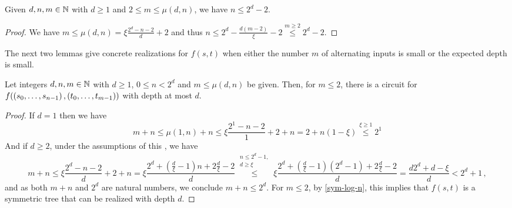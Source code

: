 
\begin{lemma} \label{n < 2^d}
Given $d, n, m \in \mathbb N$ with $d \geq 1$ and $2 \leq m \leq \mu(d, n)$, we have $n \leq 2^d - 2$.
\begin{proof}
We have $m \leq \mu(d, n) = \xi \frac{2^d - n - 2}{d} + 2$ and thus
$n \leq 2^d - \frac{d(m-2)}{\xi} - 2 \overset{m \geq 2}{\leq} 2^d - 2$.
\end{proof}
\end{lemma}

The next two lemmas give concrete realizations for $f(s, t)$
when either the number $m$ of alternating inputs is small
or the expected depth is small.

\begin{lemma}\label{depth-m-small}
Let integers $d, n, m \in \mathbb N$ with $d \geq 1$, $0 \leq n < 2^d$
and $m \leq \mu(d, n)$ be given.
Then, for $m \leq 2$,
there is a circuit for $f(\left({s_0, \dotsc, s_{n-1}}\right), \left({t_0, \dotsc, t_{m-1}}\right))$ with depth at most $d$.
\begin{proof}
 If $d=1$ then we  have
 \begin{equation*}
  m + n \leq \mu(1, n) + n \leq \xi \frac{2^1 - n - 2}{1} + 2 + n = 2 + n(1-\xi) 
    \overset{\xi \geq 1}{\leq} 2^1
 \end{equation*}
 And if $d \geq 2$, under the assumptions of this , we have
 \begin{equation*}
   m + n \leq \xi \frac{2^d - n - 2}{d} + 2 + n
    = \xi \frac{2^d + \left(\frac{d}{\xi} - 1\right) n + 2 \frac{d}{\xi} - 2}{d}
    \overset{\substack{n \leq 2^d - 1, \\ d \geq \xi}}{\leq} 
          \xi \frac{2^d + \left(\frac{d}{\xi} - 1\right) (2^{d}-1) + 2 \frac{d}{\xi} - 2}{d}
    = \frac{d 2^d + d - \xi}{d}
    < 2^d + 1\,,
 \end{equation*}
 and as both $m + n$ and $2^d$ are natural numbers, we conclude $m + n \leq 2^d$.
 For $m \leq 2$, by \cref{sym-log-n}, this implies that $f(s, t)$
 is a symmetric tree that can be realized with depth $d$.
\end{proof}
\end{lemma}

